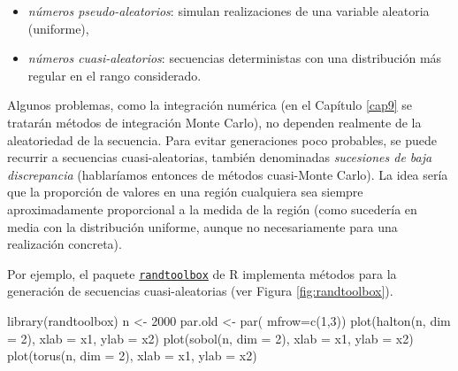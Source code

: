 \documentclass[
]{book}
\newenvironment{Shaded}{\begin{snugshade}}{\end{snugshade}}
\newcommand{\AttributeTok}[1]{\textcolor[rgb]{0.77,0.63,0.00}{#1}}
\newcommand{\DecValTok}[1]{\textcolor[rgb]{0.00,0.00,0.81}{#1}}
\newcommand{\FunctionTok}[1]{\textcolor[rgb]{0.00,0.00,0.00}{#1}}
\newcommand{\NormalTok}[1]{#1}
\newcommand{\OtherTok}[1]{\textcolor[rgb]{0.56,0.35,0.01}{#1}}
\newcommand{\StringTok}[1]{\textcolor[rgb]{0.31,0.60,0.02}{#1}}
\theoremstyle{break}
\theoremstyle{definition}
\theoremstyle{definition}
\theoremstyle{definition}
\theoremstyle{definition}
\theoremstyle{remark}
\begin{document}
\begin{itemize}
\item
  \emph{números pseudo-aleatorios}: simulan realizaciones de una variable aleatoria (uniforme),
\item
  \emph{números cuasi-aleatorios}: secuencias deterministas con una distribución más regular en el rango considerado.
\end{itemize}

Algunos problemas, como la integración numérica (en el Capítulo \ref{cap9} se tratarán métodos de integración Monte Carlo), no dependen realmente de la aleatoriedad de la secuencia. Para evitar generaciones poco probables, se puede recurrir a secuencias cuasi-aleatorias, también denominadas \emph{sucesiones de baja discrepancia} (hablaríamos entonces de métodos cuasi-Monte Carlo). La idea sería que la proporción de valores en una región cualquiera sea siempre aproximadamente proporcional a la medida de la región (como sucedería en media con la distribución uniforme, aunque no necesariamente para una realización concreta).

Por ejemplo, el paquete \href{https://CRAN.R-project.org/package=randtoolbox}{\texttt{randtoolbox}} de R implementa métodos para la generación de secuencias cuasi-aleatorias (ver Figura \ref{fig:randtoolbox}).

\begin{Shaded}
\begin{Highlighting}[]
\FunctionTok{library}\NormalTok{(randtoolbox)}
\NormalTok{n }\OtherTok{\textless{}{-}} \DecValTok{2000}
\NormalTok{par.old }\OtherTok{\textless{}{-}} \FunctionTok{par}\NormalTok{( }\AttributeTok{mfrow=}\FunctionTok{c}\NormalTok{(}\DecValTok{1}\NormalTok{,}\DecValTok{3}\NormalTok{))}
\FunctionTok{plot}\NormalTok{(}\FunctionTok{halton}\NormalTok{(n, }\AttributeTok{dim =} \DecValTok{2}\NormalTok{), }\AttributeTok{xlab =} \StringTok{\textquotesingle{}x1\textquotesingle{}}\NormalTok{, }\AttributeTok{ylab =} \StringTok{\textquotesingle{}x2\textquotesingle{}}\NormalTok{)}
\FunctionTok{plot}\NormalTok{(}\FunctionTok{sobol}\NormalTok{(n, }\AttributeTok{dim =} \DecValTok{2}\NormalTok{), }\AttributeTok{xlab =} \StringTok{\textquotesingle{}x1\textquotesingle{}}\NormalTok{, }\AttributeTok{ylab =} \StringTok{\textquotesingle{}x2\textquotesingle{}}\NormalTok{)}
\FunctionTok{plot}\NormalTok{(}\FunctionTok{torus}\NormalTok{(n, }\AttributeTok{dim =} \DecValTok{2}\NormalTok{), }\AttributeTok{xlab =} \StringTok{\textquotesingle{}x1\textquotesingle{}}\NormalTok{, }\AttributeTok{ylab =} \StringTok{\textquotesingle{}x2\textquotesingle{}}\NormalTok{)}
\end{Highlighting}
\end{Shaded}
\end{document}
